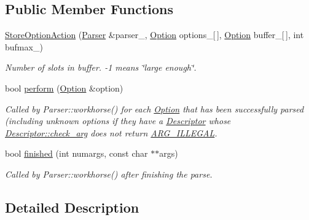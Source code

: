 \subsection*{Public Member Functions}
\begin{DoxyCompactItemize}
\item 
\hyperlink{class_option_parser_1_1_parser_1_1_store_option_action_a2a16ee59ec2f924996df3c51a368a3a6}{Store\-Option\-Action} (\hyperlink{class_option_parser_1_1_parser}{Parser} \&parser\-\_\-, \hyperlink{class_option_parser_1_1_option}{Option} options\-\_\-\mbox{[}$\,$\mbox{]}, \hyperlink{class_option_parser_1_1_option}{Option} buffer\-\_\-\mbox{[}$\,$\mbox{]}, int bufmax\-\_\-)
\begin{DoxyCompactList}\small\item\em Number of slots in {\ttfamily buffer}. {\ttfamily -\/1} means \char`\"{}large enough\char`\"{}. \end{DoxyCompactList}\item 
bool \hyperlink{class_option_parser_1_1_parser_1_1_store_option_action_a3b0486e33bbcadbd3a06a66b58031dd4}{perform} (\hyperlink{class_option_parser_1_1_option}{Option} \&option)
\begin{DoxyCompactList}\small\item\em Called by Parser\-::workhorse() for each \hyperlink{class_option_parser_1_1_option}{Option} that has been successfully parsed (including unknown options if they have a \hyperlink{struct_option_parser_1_1_descriptor}{Descriptor} whose \hyperlink{struct_option_parser_1_1_descriptor_aac19c7bd3a84282211edd0331c92a44a}{Descriptor\-::check\-\_\-arg} does not return \hyperlink{namespace_option_parser_ad237d47d58c66dea8dcf4f53ac11a6e4a6ea016ff6334ed0d2ec885e96a76c472}{A\-R\-G\-\_\-\-I\-L\-L\-E\-G\-A\-L}. \end{DoxyCompactList}\item 
bool \hyperlink{class_option_parser_1_1_parser_1_1_store_option_action_a1bdc73c5d499a0395d1b229659418070}{finished} (int numargs, const char $\ast$$\ast$args)
\begin{DoxyCompactList}\small\item\em Called by Parser\-::workhorse() after finishing the parse. \end{DoxyCompactList}\end{DoxyCompactItemize}


\subsection{Detailed Description}


